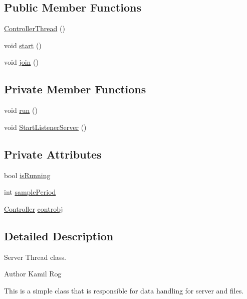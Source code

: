 \subsection*{Public Member Functions}
\begin{DoxyCompactItemize}
\item 
\hyperlink{classControllerThread_a00cd6502504f5f1e680e6be3f60a987d}{Controller\+Thread} ()
\item 
void \hyperlink{classCppThread_a1be46d1be000f41a763289300623c609}{start} ()
\item 
void \hyperlink{classCppThread_a8ff0fda6b913cc53764caef0e1200f3f}{join} ()
\end{DoxyCompactItemize}
\subsection*{Private Member Functions}
\begin{DoxyCompactItemize}
\item 
void \hyperlink{classControllerThread_ae8206a23ab1a414f2956424def2e759c}{run} ()
\item 
void \hyperlink{classControllerThread_a362c7faaf16d2556fc11ed30d571b8f3}{Start\+Listener\+Server} ()
\end{DoxyCompactItemize}
\subsection*{Private Attributes}
\begin{DoxyCompactItemize}
\item 
bool \hyperlink{classControllerThread_ad00ac5cba8e74a5ea69d5caace8c9954}{is\+Running}
\item 
int \hyperlink{classControllerThread_a5dcd0069c7d31295c7e1e598c31fadf7}{sample\+Period}
\item 
\hyperlink{classController}{Controller} \hyperlink{classControllerThread_ae37e5312460cff540a7749057db5c265}{controbj}
\end{DoxyCompactItemize}


\subsection{Detailed Description}
Server Thread class. 

\begin{DoxyAuthor}{Author}
Kamil Rog
\end{DoxyAuthor}
This is a simple class that is responsible for data handling for server and files. 

